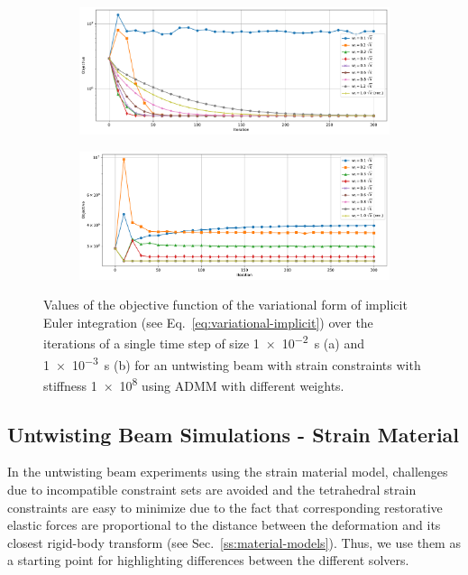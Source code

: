 \begin{figure}[h]
    \centering
    \begin{subfigure}{\textwidth}
        \includegraphics[width=\linewidth]{figures/strain_admm_weights_1e-2.pdf}
    \end{subfigure}
    \begin{subfigure}{\textwidth}
        \includegraphics[width=\linewidth]{figures/strain_admm_weights_1e-3.pdf}
    \end{subfigure}
    \caption{Values of the objective function of the variational form of implicit Euler integration (see Eq.\ \ref{eq:variational-implicit}) over the iterations of a single time 
        step of size \SI{1e-2}{\second} (a) and \SI{1e-3}{\second} (b) for an untwisting beam with strain constraints with stiffness \num{1e8} using ADMM with different weights.}
    \label{fig:strain-weights-admm}
\end{figure}

\subsection{Untwisting Beam Simulations - Strain Material}\label{ss:untwisting-beam-strain}
In the untwisting beam experiments using the strain material model, challenges due to incompatible constraint sets are avoided and the tetrahedral strain constraints are 
easy to minimize due to the fact that corresponding restorative elastic forces are proportional to the distance between the deformation and its closest rigid-body 
transform (see Sec.\ \ref{ss:material-models}). Thus, we use them as a starting point for highlighting differences between the different solvers.

